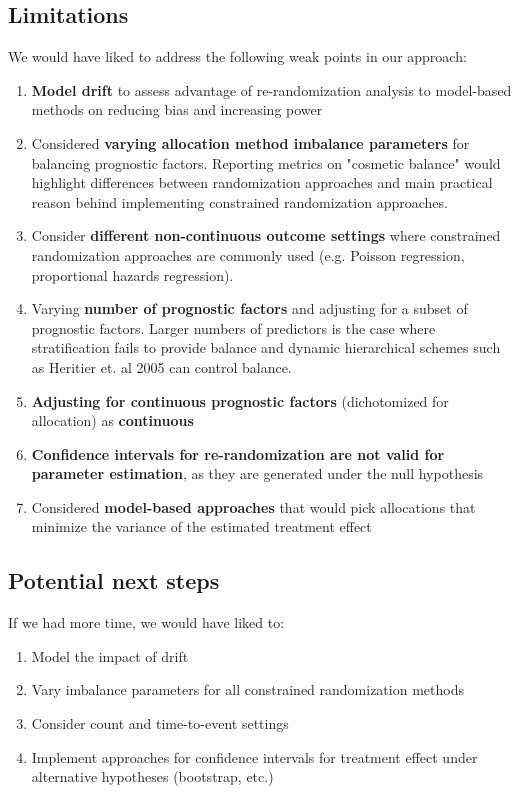 \subsection{Limitations}
We would have liked to address the following weak points in our approach:
\begin{enumerate}
	\item \textbf{Model drift} to assess advantage of re-randomization analysis to model-based methods on reducing bias and increasing power
	\item Considered \textbf{varying allocation method imbalance parameters} for balancing prognostic factors. Reporting metrics on "cosmetic balance" would highlight differences between randomization approaches and main practical reason behind implementing constrained randomization approaches.
	\item Consider \textbf{different non-continuous outcome settings} where constrained randomization approaches are commonly used (e.g. Poisson regression, proportional hazards regression).
	\item Varying \textbf{number of prognostic factors} and adjusting for a subset of prognostic factors.  Larger numbers of predictors is the case where stratification fails to provide balance and dynamic hierarchical schemes such as Heritier et. al 2005 can control balance.
	\item \textbf{Adjusting for continuous prognostic factors} (dichotomized for allocation) as \textbf{continuous}
	\item \textbf{Confidence intervals for re-randomization are not valid for parameter estimation}, as they are generated under the null hypothesis
	\item Considered \textbf{model-based approaches} that would pick allocations that minimize the variance of the estimated treatment effect
\end{enumerate}


\subsection{Potential next steps}
If we had more time, we would have liked to:
\begin{enumerate}
	\item Model the impact of drift
	\item Vary imbalance parameters for all constrained randomization methods
	\item Consider count and time-to-event settings
	\item Implement approaches for confidence intervals for treatment effect under alternative hypotheses (bootstrap, etc.)
\end{enumerate}


